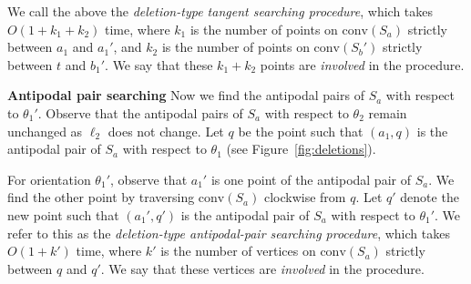 \documentclass[10pt,a4paper]{article}
\makeatletter
\newtheorem{claim}[theorem]{Claim}
\newenvironment{claimproof}[1][\proofname]{%
  \pushQED{\qed}%
  \normalfont \topsep6\p@\@plus6\p@\relax
  \trivlist
  \item[\hskip\labelsep\color{lipicsGray}\sffamily #1\@addpunct{.}]\ignorespaces
}{%
  \renewcommand\qedsymbol{\textcolor{lipicsGray}{\ensuremath{\vartriangleleft}}}%
  \popQED\endtrivlist
  \renewcommand\qedsymbol{\textcolor{lipicsGray}{\ensuremath{\blacktriangleleft}}}%
}
\theoremstyle{star}
\theoremstyle{claimstar}
\newcommand{\conv}{\ensuremath{\mathrm{conv}}}
\makeatother
\begin{document}



We call the above the \emph{deletion-type tangent searching procedure}, which takes $O(1+k_1+k_2)$ time, where $k_1$ is the number of points on $\conv(S_a)$ strictly between $a_1$ and $a_1'$, and $k_2$ is the number of points on $\conv(S_b')$ strictly between $t$ and $b_1'$. 
We say that these $k_1 + k_2$ points are \emph{involved} in the procedure.


    



\textbf{Antipodal pair searching}
Now we find the antipodal pairs of $S_a$ with respect to $\theta_1'$. Observe that the antipodal pairs of $S_a$ with respect to $\theta_2$  remain unchanged as $\ell_2$ does not change.
Let $q$ be the point such that $(a_1, q)$ is the antipodal pair of $S_a$ with respect to $\theta_1$ (see Figure~\ref{fig:deletions}).


For orientation $\theta_1'$, observe that $a_1'$ is one point of the antipodal pair of $S_a$. 
We find the other point by traversing $\conv(S_a)$ clockwise from $q$. 
Let $q'$ denote the new point such that $(a_1', q')$ is the antipodal pair of $S_a$ with respect to $\theta_1'$. 
We refer to this as the \emph{deletion-type antipodal-pair searching procedure}, which takes $O(1 + k')$ time, where $k'$ is the number of vertices on $\conv(S_a)$ strictly between $q$ and $q'$.
We say that these vertices are \emph{involved} in the procedure.
\end{document}
